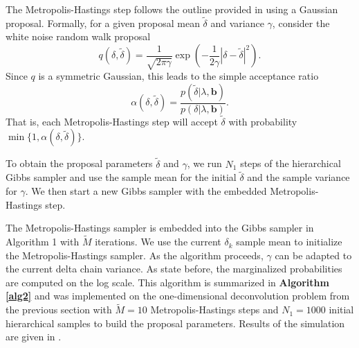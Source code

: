 \documentclass{article}
\newcommand{\vect}[1]{\boldsymbol{#1}}
\renewcommand{\tilde}{\widetilde}
\begin{document}
The Metropolis-Hastings step follows the outline provided in \cite{calvetti2007introduction} using a Gaussian proposal.
Formally, for a given proposal mean $\tilde \delta$ and variance $\gamma$, consider the white noise random walk proposal
$$
  q(\delta,\tilde \delta) = \frac {1}{\sqrt{2\pi\gamma}} \exp\left( -\frac 1{2\gamma} |\delta - \tilde \delta|^2\right).
$$
Since $q$ is a symmetric Gaussian, this leads to the simple acceptance ratio
$$
  \alpha(\delta,\tilde \delta) = \frac{p(\tilde \delta|\lambda,\vect b)}{p(\delta|\lambda,\vect b)}.
$$
That is, each Metropolis-Hastings step will accept $\tilde \delta$ with probability $\min\{1,\alpha(\delta,\tilde \delta)\}$.

To obtain the proposal parameters $\tilde \delta$ and $\gamma$, we run $N_1$ steps of the hierarchical Gibbs sampler and use the sample mean for the initial $\tilde \delta$ and the sample variance for $\gamma$.  
We then start a new Gibbs sampler with the embedded Metropolis-Hastings step.  

The Metropolis-Hastings sampler is embedded into the Gibbs sampler in Algorithm 1 with $\tilde M$ iterations.  
We use the current $\delta_k$ sample mean to initialize the Metropolis-Hastings sampler.
As the algorithm proceeds, $\gamma$ can be adapted to the current delta chain variance. 
As state before, the marginalized probabilities are computed on the log scale.
This algorithm is summarized in \textbf{Algorithm \ref{alg2}} and was implemented on the one-dimensional deconvolution problem from the previous section with $\tilde M = 10$ Metropolis-Hastings steps and $N_1 = 1000$ initial hierarchical samples to build the proposal parameters.
Results of the simulation are given in .
\end{document}
